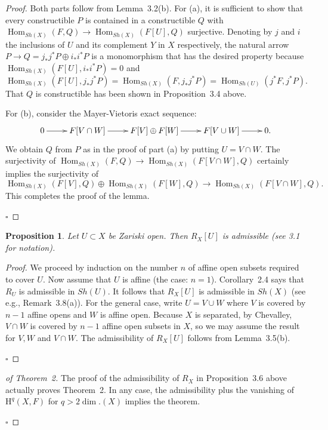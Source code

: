 \documentclass[10pt,twoside]{article}
\newtheorem{prop}[thm]{Proposition}
\newcommand{\homology}{{\mathrm {H}}}
\newcommand{\Hom}{{\operatorname{Hom}}}
\newcommand{\qed}{\nopagebreak\par\hspace*{\fill}$\square$\par\vskip2mm}
\newtheorem{proof}{Proof}
\begin{document}
\begin{proof} Both parts follow from Lemma~3.2(b). 
For (a), it is sufficient to show that 
every constructible $P$ is
contained in a constructible $Q$ with  
$ \Hom_{Sh(X)}(F,Q) \to \Hom_{Sh(X)}(F[U],Q)$ surjective.
 Denoting by $j$ and $i$ the inclusions of $U$ and its complement
 $Y$ in $X$ respectively, 
the natural arrow  
$P \to Q=j_*j^*P \oplus i_*i^*P$ is a monomorphism that has the  
desired property because  $ \Hom_{Sh(X)}(F[U], i_*i^*P)=0$ and 
$$
\Hom_{Sh(X)}(F[U], j_*j^*P )=  \Hom_{Sh(X)}(F, j_*j^*P)=
  \Hom_{Sh(U)}(j^*F, j^*P).
$$
That $Q$ is constructible has been shown in Proposition~3.4 above.


For (b), consider the Mayer-Vietoris exact sequence:
$$\xymatrix{
0 \ar[r] & F[V \cap W] \ar[r] & F[V] \oplus F[W] \ar[r] & F[V \cup W] \ar[r] & 
0.
}
$$
We obtain $Q$ from $P$ as in the proof of part (a) by
putting $U=V \cap W$. The surjectivity of  
$\Hom_{Sh(X)}(F,Q) \to \Hom_{Sh(X)}(F[V \cap W],Q)$ 
certainly implies the surjectivity of 
$$ 
\Hom_{Sh(X)}(F[V],Q) \oplus \Hom_{Sh(X)}(F[W],Q) 
\to \Hom_{Sh(X)}(F[V \cap W],Q).
$$ 
This completes the proof of the lemma.
\qed\end{proof}

\renewcommand{\thethm}{3.6}

\begin{prop}Let $U \subset X$ be Zariski open. Then $R_X[U]$ is admissible 
(see 3.1 for notation).
\end{prop}

\begin{proof} We proceed  by induction on the number $n$ of
affine open subsets required to cover $U$. Now 
assume that $U$ is affine (the case: $n=1$). 
Corollary~2.4 says that $R_U$ is admissible in $Sh(U)$. It 
follows that  $R_X[U]$ is admissible in $Sh(X)$ 
(see e.g., Remark~3.8(a)).  
For the general case, write $U=V \cup W$ where $V$ is covered by
$n-1$ affine opens and $W$ is affine open. Because $X$ is 
separated, by Chevalley, $V \cap W$ is covered by $n-1$ affine
open subsets in $X$, so we may assume the result for $V,W$ and
 $V \cap W$. The admissibility of $R_X[U]$ follows from Lemma~3.5(b).  
\qed\end{proof}

\begin{proof}[of Theorem~2]
 The proof of the admissibility of $R_X$ in Proposition~3.6 above actually
proves Theorem~2. In any case, the admissibility plus
the vanishing of $\homology^q(X,F)$ for $q>2 \dim.(X)$
implies the theorem.
\qed\end{proof}
\end{document}

